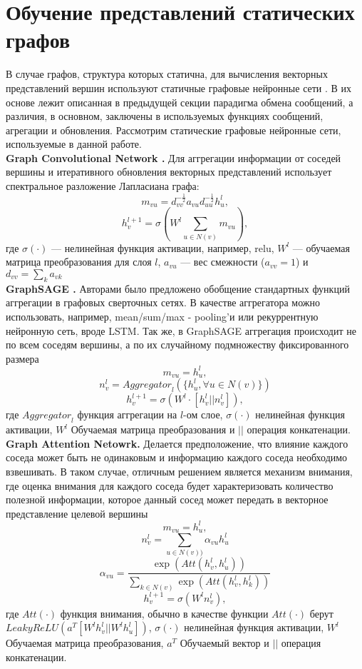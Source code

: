 \documentclass[a4paper,14pt,oneside]{mipt-thesis-ms}
\begin{document}
\section{Обучение представлений статических графов}
В случае графов, структура которых статична, для вычисления векторных представлений вершин используют статичные графовые нейронные сети \cite{kipf01, velicovic01, hamilton01, you01}. В их основе лежит описанная в предыдущей секции парадигма обмена сообщений\cite{gilmer01}, а различия, в основном, заключены в используемых функциях сообщений, агрегации и обновления. Рассмотрим статические графовые нейронные сети, используемые в данной работе.\\

{\bf Graph Convolutional Network \cite{kipf01}.} Для аггрегации информации от соседей вершины и итеративного обновления векторных представлений использует спектральное разложение Лапласиана графа:
$$m_{vu} = d_{vv}^{-\frac12}a_{vu}d_{uu}^{-\frac{1}{2}} h_u^l,$$
$$h_v^{l+1} = \sigma\left(W^l \sum_{u \in N(v)}m_{vu}\right),$$
где $\sigma(\cdot)$ --- нелинейная функция активации, например, relu, $W^l$ --- обучаемая матрица преобразования для слоя $l$, $a_{vu}$ --- вес смежности ($a_{vv} = 1$) и $d_{vv} = \sum_k a_{vk}$\\

{\bf GraphSAGE \cite{hamilton01}.} Авторами было предложено обобщение стандартных функций аггрегации в графовых сверточных сетях. В качестве аггрегатора можно использовать, например, mean/sum/max - pooling'и или рекуррентную нейронную сеть, вроде LSTM. Так же, в GraphSAGE аггрегация происходит не по всем соседям вершины, а по их случайному подмножеству фиксированного размера
$$m_{vu} = h_u^l,$$
$$n_v^l = {Aggregator}_l(\{h_u^l, \forall u \in N(v)\})$$
$$h_v^{l+1} = \sigma\left(W^l \cdot [h_v^l || n_v^l]\right),$$
где ${Aggregator}_l$ функция аггрегации на $l$-ом слое, $\sigma(\cdot)$ нелинейная функция активации, $W^l$ Обучаемая матрица преобразования и $||$ операция конкатенации.\\

{\bf Graph Attention Netowrk\cite{velicovic01}.} Делается предположение, что влияние каждого соседа может быть не одинаковым и информацию каждого соседа необходимо взвешивать. В таком случае, отличным решением является механизм внимания, где оценка внимания для каждого соседа будет характеризовать количество полезной информации, которое данный сосед может передать в векторное представление целевой вершины
$$m_{vu} = h_u^l,$$
$$n_v^l = \sum_{u \in N(v))}\alpha_{vu}h_u^l$$
$$\alpha_{vu} = \frac{\exp({Att}(h_v^l, h_u^l))}{\sum_{k \in N(v)} \exp({Att}(h_v^l, h_k^l))}$$
$$h_v^{l+1} = \sigma\left(W^l n_v^l\right),$$
где ${Att}(\cdot)$ функция внимания, обычно в качестве функции ${Att}(\cdot)$ берут ${LeakyReLU}(a^T[W^lh_v^l||W^lh_u^l])$, $\sigma(\cdot)$ нелинейная функция активации, $W^l$ Обучаемая матрица преобразования, $a^T$ Обучаемый вектор и $||$ операция конкатенации.
\end{document}
